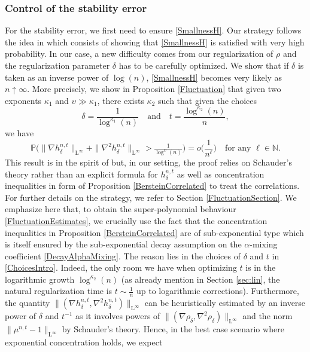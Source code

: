 \documentclass[11pt,a4paper,oneside]{amsart}
\numberwithin{equation}{section}
\newcommand{\LL}{\mathrm{L}}
\begin{document}
\subsubsection*{Control of the stability error}For the stability error, we first need to ensure \eqref{SmallnessH}. Our strategy follows the idea in \cite{ambrosio2019finer} which consists of showing that \eqref{SmallnessH} is satisfied with very high probability. In our case, a new difficulty comes from our regularization of $\rho$ and the regularization parameter $\delta$ has to be carefully optimized. We show that if $\delta$ is taken as an inverse power of $\log(n)$, \eqref{SmallnessH} becomes very likely as $n\uparrow\infty$. More precisely, we show in Proposition \ref{Fluctuation} that given two exponents $\kappa_1$ and $\upsilon\gg \kappa_1$, there exists $\kappa_2$ such that given the choices
%
\begin{equation}\label{ChoicesIntro}
%
\delta=\frac{1}{\log^{\kappa_1}(n)}\quad \text{and}\quad t=\frac{\log^{\kappa_2}(n)}{n},
%
\end{equation}
%
we have
%
\begin{equation}\label{FluctuationEstimates}
%
\mathbb{P}\Big(\|\nabla h^{n,t}_\delta\|_{\LL^{\infty}}+\|\nabla^2 h^{n,t}_\delta\|_{\LL^\infty}>\tfrac{1}{\log^{\upsilon}(n)}\Big)=o\Big(\frac{1}{n^\ell}\Big)\quad\text{for any $\ell\in \mathbb{N}$}.
%
\end{equation}
%
This result is in the spirit of \cite[Theorem 3.3]{ambrosio2019finer} but, in our setting, the proof relies on Schauder's theory rather than an explicit formula for $h^{n,t}_\delta$ as well as concentration inequalities in form of Proposition \ref{BersteinCorrelated} to treat the correlations. For further details on the strategy, we refer to Section \ref{FluctuationSection}. We emphasize here that, to obtain the super-polynomial behaviour \eqref{FluctuationEstimates}, we crucially use the fact that the concentration inequalities in Proposition \ref{BersteinCorrelated} are of sub-exponential type which is itself ensured by the sub-exponential decay assumption on the $\alpha$-mixing coefficient \eqref{DecayAlphaMixing}. The reason lies in the choices of $\delta$ and $t$ in \eqref{ChoicesIntro}. Indeed, the only room we have when optimizing $t$ is in the logarithmic growth $\log^{\kappa_2}(n)$ (as already mention in Section \ref{sec:lin}, the natural regularization time is $t\sim \frac{1}{n}$ up to logarithmic corrections). Furthermore, the quantity $\|(\nabla h^{n,t}_\delta,\nabla^2 h^{n,t}_\delta)\|_{\LL^{\infty}}$ can be heuristically estimated by an inverse power of $\delta$ and $t^{-1}$ as it involves powers of $\|(\nabla\rho_\delta,\nabla^2\rho_\delta)\|_{\LL^\infty}$ and the norm $\|\mu^{n,t}-1\|_{\LL^{\infty}}$ by Schauder's theory. Hence, in the best case scenario where exponential concentration holds, we expect
\end{document}
